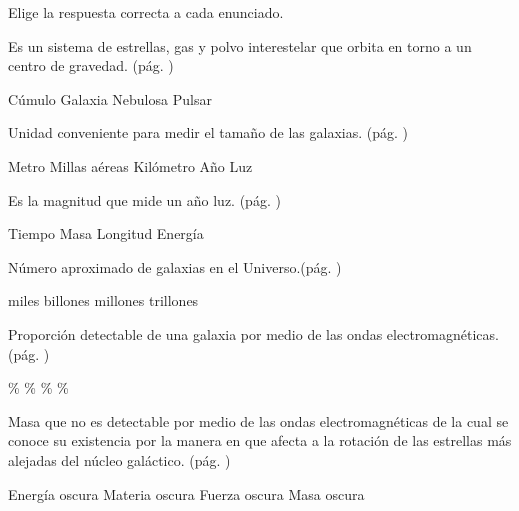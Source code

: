Elige la respuesta correcta a cada enunciado.

\begin{parts}
    Es un sistema de estrellas, gas y polvo interestelar que orbita en torno a un centro de gravedad. (pág. \pageref{085a_a})

    \begin{oneparchoices}
        \choice Cúmulo
        \CorrectChoice Galaxia
        \choice Nebulosa
        \choice Pulsar
    \end{oneparchoices}

    Unidad conveniente para medir el tamaño de las galaxias. (pág. \pageref{085a_b})

    \begin{oneparchoices}
        \choice Metro
        \choice Millas aéreas
        \choice Kilómetro
        \CorrectChoice Año Luz
    \end{oneparchoices}

    Es la magnitud que mide un año luz. (pág. \pageref{085a_c})

    \begin{oneparchoices}
        \choice Tiempo
        \choice Masa
        \CorrectChoice Longitud
        \choice Energía
    \end{oneparchoices}

    Número aproximado de galaxias en el Universo.(pág. \pageref{085a_d})

    \begin{oneparchoices}
        \choice miles
        \CorrectChoice billones
        \choice millones
        \choice trillones
    \end{oneparchoices}

    Proporción detectable de una galaxia por medio de las ondas electromagnéticas. (pág. \pageref{085a_e})

    \begin{oneparchoices}
        \%
        \%
        \%
        \%
    \end{oneparchoices}

    Masa que no es detectable por medio de las ondas electromagnéticas de la cual se conoce su existencia
    por la manera en que afecta a la rotación de las estrellas más alejadas del núcleo galáctico. (pág. \pageref{085a_f})

    \begin{oneparchoices}
        \choice Energía oscura
        \CorrectChoice Materia oscura
        \choice Fuerza oscura
        \choice Masa oscura
    \end{oneparchoices}
\end{parts}